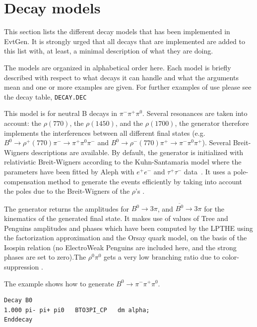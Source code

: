 \section{Decay models}
\label{sect:models}

This section lists the different decay models that has been 
implemented in EvtGen. It is strongly urged that all decays that
are implemented are added to this list with, at least, a minimal 
description of what they are doing. 

The models are organized in alphabetical order here. Each model
is briefly described with respect to what decays it can handle and
what the arguments mean and one or more examples are given. For
further examples of use please see the decay table, {\tt DECAY.DEC}


\label{bto3picp}



\Expl
This model is for neutral B decays in $\pi^-\pi^+\pi^0$. 
Several resonances are taken into account: the $\rho(770)$, the $\rho(1450)$, and the $\rho(1700)$, the generator therefore implements the interferences between all different final states (e.g. $B^0 \rightarrow \rho^+(770) \pi^- \rightarrow \pi^+\pi^0\pi^-$ and $B^0 \rightarrow \rho^-(770) \pi^+ \rightarrow \pi^-\pi^0\pi^+$). Several Breit-Wigners descriptions are available. By default, the generator is initialized with relativistic Breit-Wigners according to the Kuhn-Santamaria model where the parameters have been fitted by Aleph with $e^+e^-$ and $\tau^+\tau^-$ data~\cite{AlephRho}.
It uses a pole-compensation method to generate the events efficiently by taking into account the poles due to the Breit-Wigners of the $\rho$'s \cite{3piNote}. 

The generator returns the amplitudes for $B^0 \rightarrow 3\pi$, and $\overline{B^0} \rightarrow 3\pi$ for the kinematics of the generated final state. It makes use of values of Tree and Penguins amplitudes and phases which have
been computed by the LPTHE using the factorization approximation and the Orsay
quark model, on the basis of the Isospin relation (no ElectroWeak Penguins
are included here, and the strong phases are set to zero).The $\rho^0\pi^0$ gets a very low branching ratio due to color-suppression \cite{3piBook}.

\Example
\noindent The example shows how to generate $B^0 \rightarrow \pi^-\pi^+\pi^0$.
\begin{verbatim}
Decay B0
1.000 pi- pi+ pi0   BTO3PI_CP   dm alpha;
Enddecay
\end{verbatim}


